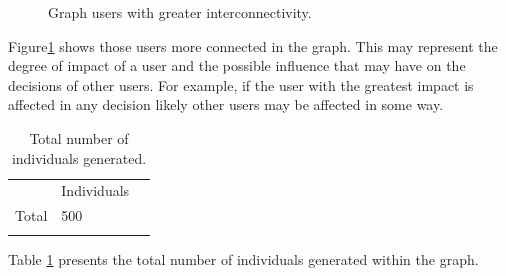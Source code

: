 \begin{figure}
\centering
{} %
\caption{Graph users with greater interconnectivity.}
\label{fig:guserknown_1}
\end{figure}

Figure\ref{fig:guserknown_1} shows those users more connected in the graph. This
may represent the degree of impact of a user and the possible influence that may
have on the decisions of other users. For example, if the user with the greatest
impact is affected in any decision likely other users may be affected in some
way.


\begin{table}
\small
\caption{Total number of individuals generated.}
\label{tab:totalIndividuals_12}
\centering
\small
\begin{tabular}{p{3cm} p{3cm} p{3cm} }
\hline\noalign{\smallskip}
  & Individuals &  \\
\noalign{\smallskip}\hline\noalign{\smallskip}
\small{Total } & \small{500} & \\ \hline
\noalign{\smallskip}\hline
\end{tabular}
\end{table}


Table \ref{tab:totalIndividuals_12} presents the total number of individuals
generated within the graph.

